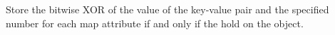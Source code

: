 Store the bitwise XOR of the value of the key-value pair and the specified
number for each map attribute if and only if the  hold on the
object.



